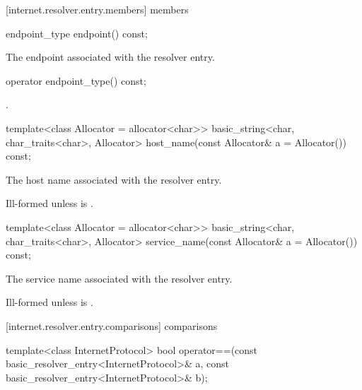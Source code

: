 [internet.resolver.entry.members]{ members}

\begin{itemdecl}
endpoint_type endpoint() const;
\end{itemdecl}

\begin{itemdescr}
\pnum
\returns The endpoint associated with the resolver entry.
\end{itemdescr}

\begin{itemdecl}
operator endpoint_type() const;
\end{itemdecl}

\begin{itemdescr}
\pnum
\returns {}.
\end{itemdescr}

\begin{itemdecl}
template<class Allocator = allocator<char>>
  basic_string<char, char_traits<char>, Allocator>
    host_name(const Allocator& a = Allocator()) const;
\end{itemdecl}

\begin{itemdescr}
\pnum
\returns The host name associated with the resolver entry.

\pnum
\remarks Ill-formed unless  is .
\end{itemdescr}

\begin{itemdecl}
template<class Allocator = allocator<char>>
  basic_string<char, char_traits<char>, Allocator>
    service_name(const Allocator& a = Allocator()) const;
\end{itemdecl}

\begin{itemdescr}
\pnum
\returns The service name associated with the resolver entry.

\pnum
\remarks Ill-formed unless  is .
\end{itemdescr}



[internet.resolver.entry.comparisons]{ comparisons}

\begin{itemdecl}
template<class InternetProtocol>
  bool operator==(const basic_resolver_entry<InternetProtocol>& a,
                  const basic_resolver_entry<InternetProtocol>& b);
\end{itemdecl}

